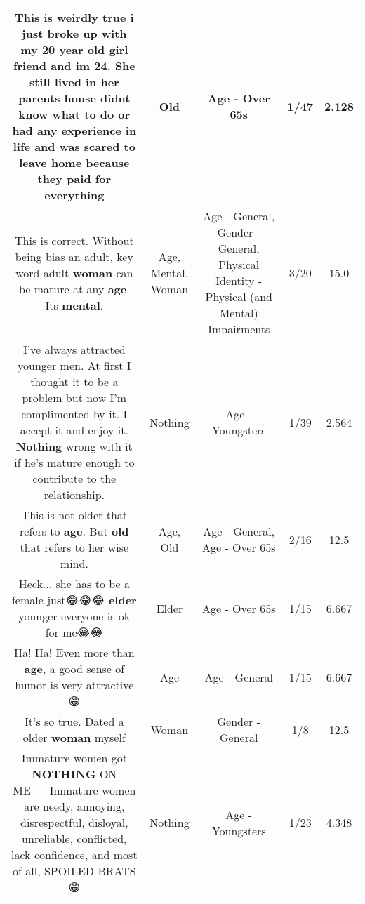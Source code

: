 \documentclass[11pt]{article}
\newlength\mylength
\begin{document}
\begin{center}
\begin{longtable}{|C{.65\mylength}|C{.30\mylength}|C{.12\mylength}|C{.12\mylength}|C{.12\mylength}|}
  \small This is weirdly true i just broke up with my 20 year \textbf{old} girl friend and im 24. She still lived in her parents house didnt know what to do or had any experience in life and was scared to leave home because they paid for everything\normalsize   & Old & Age - Over 65s & 1/47 & 2.128 \\  \hline
  \small This is correct. Without being bias an adult, key word adult \textbf{woman} can be mature at any \textbf{age}. Its \textbf{mental}.\normalsize   & Age, Mental, Woman & Age - General, Gender - General, Physical Identity - Physical (and Mental) Impairments & 3/20 & 15.0 \\  \hline
  \small I've always attracted younger men. At first I thought it to be a problem but now I'm complimented by it. I accept it and enjoy it. \textbf{Nothing} wrong with it if he's mature enough to contribute to the relationship.\normalsize   & Nothing & Age - Youngsters & 1/39 & 2.564 \\  \hline
  \small This is not older that refers to \textbf{age}. But \textbf{old} that refers to her wise mind.\normalsize   & Age, Old & Age - General, Age - Over 65s & 2/16 & 12.5 \\  \hline
  \small Heck... she has to be a female just😂😂😂 \textbf{elder} younger everyone is ok for me😂😂\normalsize   & Elder & Age - Over 65s & 1/15 & 6.667 \\  \hline
  \small Ha! Ha! Even more than \textbf{age},  a good sense of humor is very attractive 😁\normalsize   & Age & Age - General & 1/15 & 6.667 \\  \hline
  \small It's so true. Dated a older \textbf{woman} myself\normalsize   & Woman & Gender - General & 1/8 & 12.5 \\  \hline
  \small Immature women got \textbf{NOTHING} ON ME💯💯💯💯💯💯Immature women are needy, annoying, disrespectful, disloyal, unreliable, conflicted, lack confidence, and most of all, SPOILED BRATS😁\normalsize   & Nothing & Age - Youngsters & 1/23 & 4.348 \\  \hline

\end{longtable}
\end{center}
\end{document}
